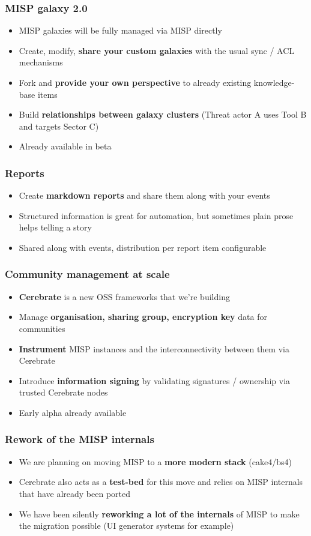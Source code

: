 \begin{frame}
\frametitle{MISP galaxy 2.0}
\begin{itemize}
	\item MISP galaxies will be fully managed via MISP directly
        \item Create, modify, {\bf share your custom galaxies} with the usual sync / ACL mechanisms
        \item Fork and {\bf provide your own perspective} to already existing knowledge-base items
        \item Build {\bf relationships between galaxy clusters} (Threat actor A uses Tool B and targets Sector C)
        \item Already available in beta
\end{itemize}
\end{frame}

\begin{frame}
\frametitle{Reports}
\begin{itemize}
	\item Create {\bf markdown reports} and share them along with your events
        \item Structured information is great for automation, but sometimes plain prose helps telling a story
        \item Shared along with events, distribution per report item configurable
\end{itemize}
\end{frame}

\begin{frame}
\frametitle{Community management at scale}
\begin{itemize}
	\item {\bf Cerebrate} is a new OSS frameworks that we're building
        \item Manage {\bf organisation, sharing group, encryption key} data for communities
        \item {\bf Instrument} MISP instances and the interconnectivity between them via Cerebrate
        \item Introduce {\bf information signing} by validating signatures / ownership via trusted Cerebrate nodes
        \item Early alpha already available
\end{itemize}
\end{frame}

\begin{frame}
\frametitle{Rework of the MISP internals}
\begin{itemize}
	\item We are planning on moving MISP to a {\bf more modern stack} (cake4/bs4)
        \item Cerebrate also acts as a {\bf test-bed} for this move and relies on MISP internals that have already been ported
        \item We have been silently {\bf reworking a lot of the internals} of MISP to make the migration possible (UI generator systems for example)
\end{itemize}
\end{frame}

